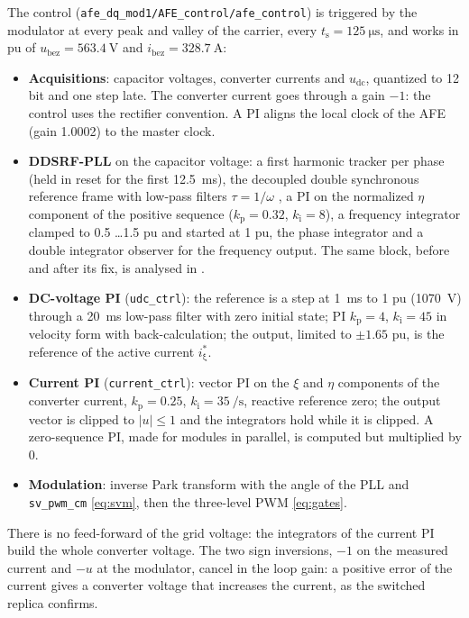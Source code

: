 \documentclass[11pt,a4paper]{scrartcl}
\newcommand{\ped}[1]{_{\mathrm{#1}}}
\newcommand{\code}[1]{\texttt{#1}}
\begin{document}
\begin{onehalfspace}
The control (\code{afe\_dq\_mod1/AFE\_control/afe\_control}) is triggered by the modulator at every peak and valley of the carrier, every $t\ped{s} = \SI{125}{\micro\second}$, and works in pu of $u\ped{bez} = \SI{563.4}{\volt}$ and $i\ped{bez} = \SI{328.7}{\ampere}$:
\begin{itemize}
	\item \textbf{Acquisitions}: capacitor voltages, converter currents and $u\ped{dc}$, quantized to 12 bit and one step late. The converter current goes through a gain $-1$: the control uses the rectifier convention. A PI aligns the local clock of the AFE (gain \num{1.0002}) to the master clock.
	\item \textbf{DDSRF-PLL} on the capacitor voltage: a first harmonic tracker per phase (held in reset for the first \SI{12.5}{\milli\second}), the decoupled double synchronous reference frame with low-pass filters $\tau = 1/\omega$ \cite{rodriguez2007}, a PI on the normalized $\eta$ component of the positive sequence ($k\ped{p} = 0.32$, $k\ped{i} = 8$), a frequency integrator clamped to \num{0.5} \ldots \num{1.5} pu and started at \num{1} pu, the phase integrator and a double integrator observer for the frequency output. The same block, before and after its fix, is analysed in \cite{note_pll3}.
	\item \textbf{DC-voltage PI} (\code{udc\_ctrl}): the reference is a step at \SI{1}{\milli\second} to \num{1} pu (\SI{1070}{\volt}) through a \SI{20}{\milli\second} low-pass filter with zero initial state; PI $k\ped{p} = 4$, $k\ped{i} = 45$ in velocity form with back-calculation; the output, limited to $\pm\num{1.65}$ pu, is the reference of the active current $i\ped{\xi}^*$.
	\item \textbf{Current PI} (\code{current\_ctrl}): vector PI on the $\xi$ and $\eta$ components of the converter current, $k\ped{p} = 0.25$, $k\ped{i} = \SI{35}{\per\second}$, reactive reference zero; the output vector is clipped to $|u| \le 1$ and the integrators hold while it is clipped. A zero-sequence PI, made for modules in parallel, is computed but multiplied by \num{0}.
	\item \textbf{Modulation}: inverse Park transform with the angle of the PLL and \code{sv\_pwm\_cm} \eqref{eq:svm}, then the three-level PWM \eqref{eq:gates}.
\end{itemize}
There is no feed-forward of the grid voltage: the integrators of the current PI build the whole converter voltage. The two sign inversions, $-1$ on the measured current and $-u$ at the modulator, cancel in the loop gain: a positive error of the current gives a converter voltage that increases the current, as the switched replica confirms.


\end{onehalfspace}
\end{document}
